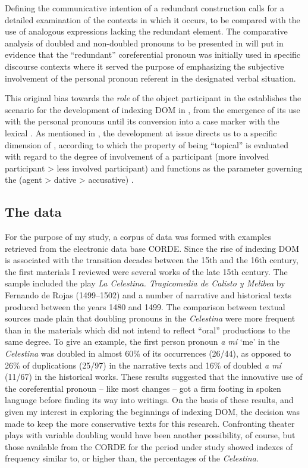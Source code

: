 \documentclass[output=paper]{LSP/langsci}
\begin{document}
 Defining the communicative intention of a redundant construction calls for a detailed examination of the contexts in which it occurs, to be compared with the use of analogous expressions lacking the redundant element. The comparative analysis of doubled and non-doubled pronouns to be presented in  will put in evidence that the “redundant” coreferential pronoun was initially used in specific discourse contexts where it served the purpose of emphasizing the subjective involvement of the personal pronoun referent in the designated verbal situation.

This original bias towards the \textit{role} of the object participant in the  establishes the scenario for the development of indexing DOM in , from the emergence of its use with the personal pronouns until its conversion into a case marker with the lexical . As mentioned in , the development at issue directs us to a specific dimension of , according to which the property of being “topical” is evaluated with regard to the degree of involvement of a participant (more involved participant > less involved participant) and functions as the parameter governing the  (agent > dative > accusative) \citep{Givon1976Topic}.


\subsection{The data}\label{04-me-sec:4.4}

For the purpose of my study, a corpus of data was formed with examples retrieved from the electronic data base CORDE. Since the rise of  indexing DOM is associated with the transition decades between the 15th and the 16th century, the first materials I reviewed were several works of the late 15th century. The sample included the play \textit{La Celestina. Tragicomedia de Calisto y Melibea} by Fernando de Rojas (1499–1502) and a number of narrative and historical texts produced between the years 1480 and 1499. The comparison between textual sources made plain that doubling pronouns in the \textit{Celestina} were more frequent than in the materials which did not intend to reflect “oral” productions to the same degree. To give an example, the first person pronoun \textit{a mí} ‘me’ in the \textit{Celestina} was doubled in almost 60\% of its occurrences (26/44), as opposed to 26\% of duplications (25/97) in the narrative texts and 16\% of doubled \textit{a mí} (11/67) in the historical works. These results suggested that the innovative use of the coreferential pronoun – like most changes – got a firm footing in spoken language before finding its way into writings. On the basis of these results, and given my interest in exploring the beginnings of indexing DOM, the decision was made to keep the more conservative texts for this research. Confronting theater plays with variable doubling would have been another possibility, of course, but those available from the CORDE for the period under study showed indexes of frequency similar to, or higher than, the percentages of the \textit{Celestina.}
\end{document}

